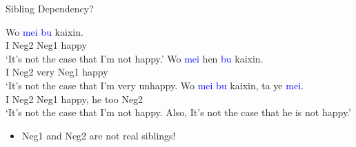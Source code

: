 \documentclass[professionalfonts, xcolor={usenames,svgnames,x11names,table}]{beamer}
\begin{document}
\begin{frame}{Sibling Dependency?}

 \begin{exe}
        \ex
        \begin{xlist}
            \ex \label{mylabel2} \gll Wo  \textcolor{blue}{mei}  \textcolor{blue}{bu}  kaixin. \\
                     I  Neg2  Neg1  happy \\
                \glt `It's not the case that I'm not happy.'
             \pause
             \ex \gll Wo  \textcolor{blue}{mei}  hen  \textcolor{blue}{bu}  kaixin. \\
                     I  Neg2  very  Neg1  happy \\
                \glt `It's not the case that I'm very unhappy.
                \pause
            \ex \gll Wo  \textcolor{blue}{mei}  \textcolor{blue}{bu}  kaixin,  ta  ye  \textcolor{blue}{mei}. \\
                     I  Neg2  Neg1  happy, he  too  Neg2 \\
                \glt `It's not the case that I'm not happy. Also, It's not the case that he is not happy.'
                \end{xlist}
\end{exe}

\begin{itemize}
\pause
\item \textcolor{cadmiumgreen}{Neg1 and Neg2 are not real siblings!} 
\end{itemize}
\end{frame}
\end{document}
